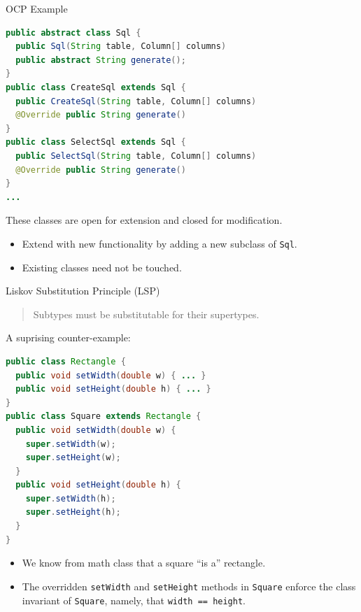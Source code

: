 \documentclass{beamer}
\begin{document}
\begin{frame}[fragile]{OCP Example}

\begin{lstlisting}[language=Java]
public abstract class Sql {
  public Sql(String table, Column[] columns)
  public abstract String generate();
}
public class CreateSql extends Sql {
  public CreateSql(String table, Column[] columns)
  @Override public String generate()
}
public class SelectSql extends Sql {
  public SelectSql(String table, Column[] columns)
  @Override public String generate()
}
...
\end{lstlisting}

These classes are open for extension and closed for modification.
\begin{itemize}
\item Extend with new functionality by adding a new subclass of {\tt Sql}.
\item Existing classes need not be touched.
\end{itemize}

\end{frame}

\begin{frame}[fragile]{Liskov Substitution Principle (LSP)}
\vspace{-.05in}
\begin{quote}
Subtypes must be substitutable for their supertypes.
\end{quote}
\vspace{-.075in}
A suprising counter-example:
\vspace{-.05in}
\begin{lstlisting}[language=Java]
public class Rectangle {
  public void setWidth(double w) { ... }
  public void setHeight(double h) { ... }
}
public class Square extends Rectangle {
  public void setWidth(double w) {
    super.setWidth(w);
    super.setHeight(w);
  }
  public void setHeight(double h) {
    super.setWidth(h);
    super.setHeight(h);
  }
}
\end{lstlisting}
\vspace{-.1in}
\begin{itemize}
\item We know from math class that a square ``is a'' rectangle. 
\item The overridden {\tt setWidth} and {\tt setHeight} methods in {\tt Square} enforce the class invariant of {\tt Square}, namely, that {\tt width == height}.
\end{itemize}


\end{frame}
\end{document}

